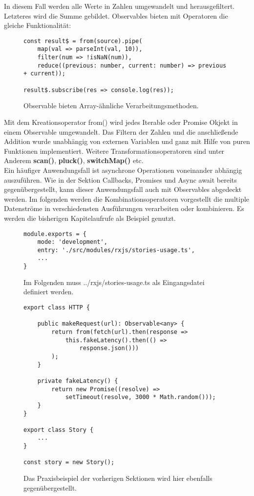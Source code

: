\noindent
In diesem Fall werden alle Werte in Zahlen umgewandelt und herausgefiltert. Letzteres wird die Summe gebildet. Observables bieten mit Operatoren die gleiche Funktionalität:

\begin{figure}[H]
\begin{lstlisting}[basicstyle=\small]
const result$ = from(source).pipe(
    map(val => parseInt(val, 10)),
    filter(num => !isNaN(num)),
    reduce((previous: number, current: number) => previous + current));

result$.subscribe(res => console.log(res));
\end{lstlisting}
\caption{Observable bieten Array-ähnliche Verarbeitungsmethoden.}
\end{figure}

\noindent
Mit dem Kreationsoperator from() wird jedes Iterable oder Promise Okjekt in einem Observable umgewandelt. Das Filtern der Zahlen und die anschließende Addition wurde unabhängig von externen Variablen und ganz mit Hilfe von puren Funktionen implementiert. Weitere Transformationsoperatoren sind unter Anderem \textbf{scan()}, \textbf{pluck()}, \textbf{switchMap()} etc.\\

\noindent
Ein häufiger Anwendungsfall ist asynchrone Operationen voneinander abhängig auszuführen. Wie in der Sektion Callbacks, Promises und Async await bereits gegenübergestellt, kann dieser Anwendungsfall auch mit Observables abgedeckt werden. Im folgenden werden die Kombinationsoperatoren vorgestellt die multiple Datenströme in verschiedensten Ausführungen verarbeiten oder kombinieren. Es werden die bisherigen Kapitelaufrufe als Beispiel genutzt. 

\begin{figure}[H]
\begin{lstlisting}[basicstyle=\small]
module.exports = {
    mode: 'development',
    entry: './src/modules/rxjs/stories-usage.ts',
    ...
}
\end{lstlisting}
\caption{Im Folgenden muss ../rxjs/stories-usage.ts als Eingangsdatei definiert werden.}
\end{figure}

\begin{figure}[H]
\begin{lstlisting}[basicstyle=\small]
export class HTTP {

    public makeRequest(url): Observable<any> {
        return from(fetch(url).then(response =>
            this.fakeLatency().then(() =>
                response.json()))
        );
    }

    private fakeLatency() {
        return new Promise((resolve) =>
            setTimeout(resolve, 3000 * Math.random()));
    }
}

export class Story {
    ...
}

const story = new Story();
\end{lstlisting}
\caption{Das Praxisbeispiel der vorherigen Sektionen wird hier ebenfalls gegenübergestellt.}
\end{figure}

